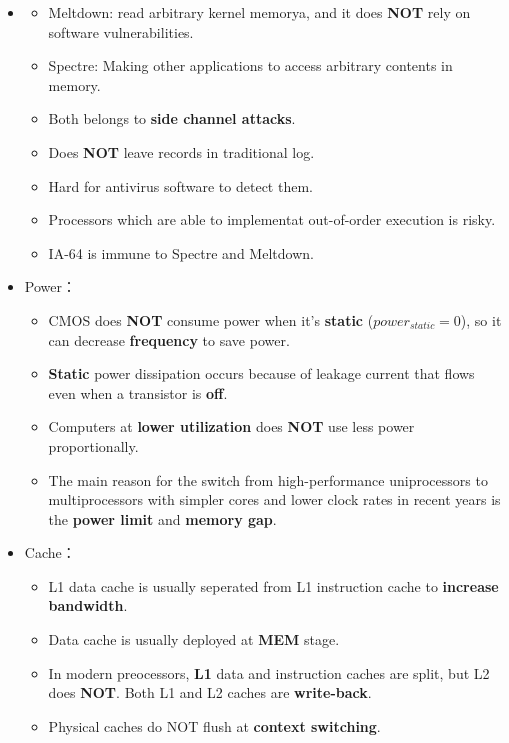 \begin{itemize}
\begin{itemize}
\begin{itemize}
    \end{itemize}
    \item \quad\quad \begin{itemize}
        \item Meltdown: read arbitrary kernel memorya, and it does \textbf{NOT} rely on software vulnerabilities.
        \item Spectre: Making other applications to access arbitrary contents in memory.
        \item Both belongs to \textbf{side channel attacks}.
        \item Does \textbf{NOT} leave records in traditional log.
        \item Hard for antivirus software to detect them.
        \item Processors which are able to implementat out-of-order execution is risky.
        \item IA-64 is immune to Spectre and Meltdown. 
    \end{itemize}
    \item Power： \begin{itemize}
        \item CMOS does \textbf{NOT} consume power when it's \textbf{static} ($power_{static} = 0$), so it can decrease \textbf{frequency} to save power.
        \item \textbf{Static} power dissipation occurs because of leakage current that flows even when a transistor is \textbf{off}.
        \item Computers at \textbf{lower utilization} does \textbf{NOT} use less power proportionally.
        \item The main reason for the switch from high-performance uniprocessors to multiprocessors with simpler cores and lower clock rates in recent years is the \textbf{power limit} and \textbf{memory gap}.
    \end{itemize}
    \item Cache： \begin{itemize}
        \item L1 data cache is usually seperated from L1 instruction cache to \textbf{increase bandwidth}.
        \item Data cache is usually deployed at \textbf{MEM} stage.
        \item In modern preocessors, \textbf{L1} data and instruction caches are split, but L2 does \textbf{NOT}. Both L1 and L2 caches are \textbf{write-back}.
        \item Physical caches do NOT flush at \textbf{context switching}.

\end{itemize}
\end{itemize}
\end{itemize}
